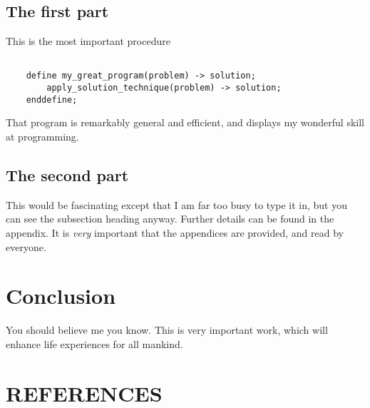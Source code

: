 \subsection{The first part}

This is the most important procedure


\begin{verbatim}

    define my_great_program(problem) -> solution;
        apply_solution_technique(problem) -> solution;
    enddefine;

\end{verbatim}

That program is remarkably general and efficient, and displays my
wonderful skill at programming.

\subsection{The second part}


This would be fascinating except that I am far too busy to type it in,
but you can see the subsection heading anyway. Further details can be
found in the appendix. It is \emph{very} important that the appendices
are provided, and read by everyone.
\SP



\section{Conclusion}

You should believe me you know. This is very important work, which will
enhance life experiences for all mankind.

\section{REFERENCES}

\parindent 0mm  %

